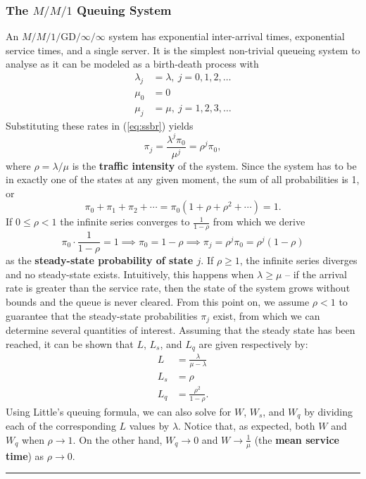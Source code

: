 \subsubsection{The $M/M/1$ Queuing System}
An $M/M/1/\textrm{GD}/\infty/\infty$ system has exponential inter-arrival times, exponential service times, and a single server. It is the simplest non-trivial queueing system to analyse as it can be modeled as a birth-death process with
\begin{align*}
\lambda_{j} &= \lambda, \ j=0,1,2,\ldots \\ 
\mu_{0} &= 0 \\
\mu_{j} &= \mu,\  j=1,2,3,\ldots 
\end{align*}
Substituting these rates in (\ref{eq:ssbr}) yields 
$$\pi_{j} = \frac{\lambda^{j} \pi_{0}}{\mu^{j}}=\rho^j \pi_0,$$ where $\rho = \lambda/\mu$ is the \textbf{traffic intensity} of the system. Since the system has to be in exactly one of the states at any given moment, the sum of all probabilities is 1, or $$ \pi_{0}+\pi_1 + \pi_2+\cdots = \pi_0(1+\rho+\rho^{2}+\cdots ) = 1.$$
If $0 \leq \rho < 1$ the infinite series converges to $\frac{1}{1-\rho}$ from which we derive $$\pi_{0}\cdot \frac{1}{1-\rho} = 1 \implies \pi_0 = 1-\rho \implies \pi_{j} = \rho^{j} \pi_0 = \rho^j (1-\rho)$$
as the \textbf{steady-state probability of state $j$}.  If $\rho \geq 1$, the infinite series diverges and no steady-state exists. Intuitively, this happens when $\lambda \geq \mu$ -- if the arrival rate is greater than the service rate, then the state of the system grows without bounds and the queue is never cleared.
\newl From this point on, we assume $\rho < 1$ to guarantee that the steady-state probabilities $\pi_{j}$  exist, from which we can determine several quantities of interest. Assuming
that the steady state has been reached, it can be shown that $L$, $L_{s}$, and $L_{q}$ are given respectively by:
\begin{align*}
L &= \frac{\lambda}{\mu - \lambda}\\
L_{s} &= \rho\\
 L_{q} &= \frac{\rho^{2}}{1-\rho}.
 \end{align*}
Using Little's queuing formula, we can also solve for $W$, $W_{s}$, and $W_{q}$ by dividing each of the corresponding $L$ values by $\lambda$.  Notice that, as expected, both $W$ and $W_{q}$ when $\rho\to 1$. On the other hand, $W_{q}\to 0$ and $W\to \frac{1}{\mu}$ (the \textbf{mean service time}) as $\rho\to 0$.
\begin{center}
    \rule{0.5\textwidth}{.4pt}
\end{center}
